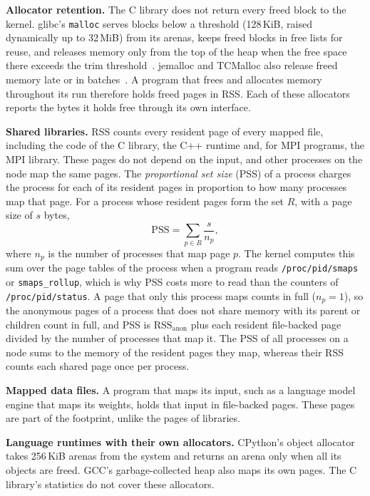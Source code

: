 \documentclass[11pt]{article}
\newcommand{\term}[1]{\emph{#1}}
\begin{document}
\textbf{Allocator retention.} The C library does not return every freed block to the kernel. glibc's
\texttt{malloc} serves blocks below a threshold (128\,KiB, raised dynamically up to 32\,MiB) from its arenas, keeps
freed blocks in free lists for reuse, and releases memory only from the top of the heap when the free space there
exceeds the trim threshold~\cite{glibcmanual}. jemalloc and TCMalloc also release freed memory late or in
batches~\cite{Evans2006jemalloc,Hunter2021Temeraire}. A program that frees and allocates memory throughout its run
therefore holds freed pages in RSS. Each of these allocators reports the bytes it holds free through its own
interface.

\textbf{Shared libraries.} RSS counts every resident page of every mapped file, including the code of the C library,
the C++ runtime and, for MPI programs, the MPI library. These pages do not depend on the input, and other processes on
the node map the same pages. The \term{proportional set size} (PSS) of a process charges the process for each of its
resident pages in proportion to how many processes map that page. For a process whose resident pages form the set
$R$, with a page size of $s$ bytes,
\begin{equation}
\mathrm{PSS} = \sum_{p \in R} \frac{s}{n_p} ,
\end{equation}
where $n_p$ is the number of processes that map page $p$. The kernel computes this sum over the page tables of the
process when a program reads \texttt{/proc/pid/smaps} or \texttt{smaps\_rollup}, which is why PSS costs more to read
than the counters of \texttt{/proc/pid/status}. A page that only this process maps counts in full ($n_p = 1$), so
the anonymous pages of a process that does not share memory with its parent or children count in full, and PSS is
$\mathrm{RSS}_{\mathrm{anon}}$ plus each resident file-backed page divided by the number of processes that map it. The
PSS of all processes on a node sums to the memory of the resident pages they map, whereas their RSS counts each shared page once per process.

\textbf{Mapped data files.} A program that maps its input, such as a language model engine that maps its weights,
holds that input in file-backed pages. These pages are part of the footprint, unlike the pages of libraries.

\textbf{Language runtimes with their own allocators.} CPython's object allocator takes 256\,KiB arenas from the system
and returns an arena only when all its objects are freed. GCC's garbage-collected heap also maps its own pages. The C
library's statistics do not cover these allocators.
\end{document}
